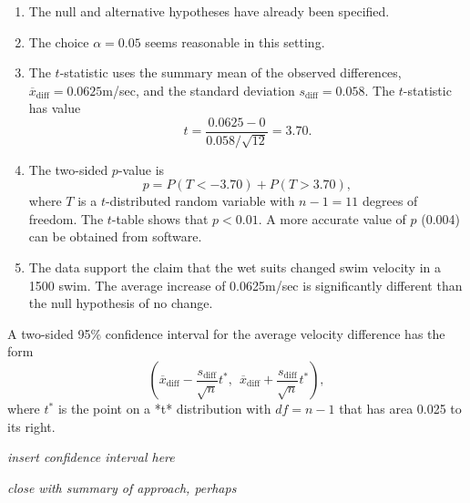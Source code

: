 \begin{enumerate}

 \item The null and alternative hypotheses have already been specified.

  \item The choice $\alpha = 0.05$ seems reasonable in this setting.

  \item The $t$-statistic uses the summary mean of the observed differences, $\overline{x}_{\text{diff}} = 0.0625$m/sec, and the standard deviation $s_{\text{diff}} = 0.058$.  The $t$-statistic has value  
\[
	  t = \frac{0.0625 - 0}{0.058/\sqrt{12}} = 3.70. 
\]

\item The two-sided $p$-value is
$$ p = P(T < -\text{3.70}) + P(T > \text{3.70}), $$
where $T$ is a $t$-distributed random variable with $n-1 = 11$  degrees of freedom.
The $t$-table shows that $p < 0.01$. A more accurate value of $p$ (0.004) can be obtained from software. 

\item  The data support the claim that the wet suits changed swim velocity in a 1500 swim. The average increase of 0.0625m/sec is significantly different than  the null hypothesis of no change.

\end{enumerate}

A two-sided 95\% confidence interval for the average velocity difference has the form 
\[ \left(
  \overline{x}_{\text{diff}} - \frac{s_{\text{diff}}}{\sqrt{n}} t^*,
  \:\: \overline{x}_{\text{diff}} + \frac{s_{\text{diff}}}{\sqrt{n}} t^* \right), 
\] 
where $t^*$ is the point on a *t* distribution with $df = n-1$ that has area 0.025 to its right.  

\textit{insert confidence interval here}

\textit{close with summary of approach, perhaps}


